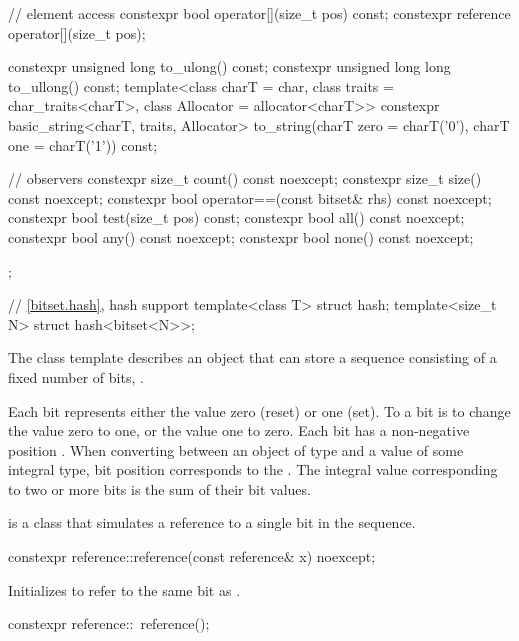 \begin{codeblock}
{{    // element access
    constexpr bool operator[](size_t pos) const;
    constexpr reference operator[](size_t pos);

    constexpr unsigned long to_ulong() const;
    constexpr unsigned long long to_ullong() const;
    template<class charT = char,
             class traits = char_traits<charT>,
             class Allocator = allocator<charT>>
      constexpr basic_string<charT, traits, Allocator>
        to_string(charT zero = charT('0'), charT one = charT('1')) const;

    // observers
    constexpr size_t count() const noexcept;
    constexpr size_t size() const noexcept;
    constexpr bool operator==(const bitset& rhs) const noexcept;
    constexpr bool test(size_t pos) const;
    constexpr bool all() const noexcept;
    constexpr bool any() const noexcept;
    constexpr bool none() const noexcept;
  };

  // \ref{bitset.hash}, hash support
  template<class T> struct hash;
  template<size_t N> struct hash<bitset<N>>;
}
\end{codeblock}

\pnum
The class template
describes an object that can store a sequence consisting of a fixed number of
bits, .

\pnum
Each bit represents either the value zero (reset) or one (set).
To
a bit is to change the value zero to one, or the value one to
zero.
Each bit has a non-negative position .
When converting
between an object of type
and a value of some
integral type, bit position  corresponds to the
.
The integral value corresponding to two
or more bits is the sum of their bit values.

\pnum
{}
is a class that simulates a reference to a single bit in the sequence.

%
\begin{itemdecl}
constexpr reference::reference(const reference& x) noexcept;
\end{itemdecl}

\begin{itemdescr}
\pnum
\effects
Initializes  to refer to the same bit as .
\end{itemdescr}

%
\begin{itemdecl}
constexpr reference::~reference();
\end{itemdecl}

